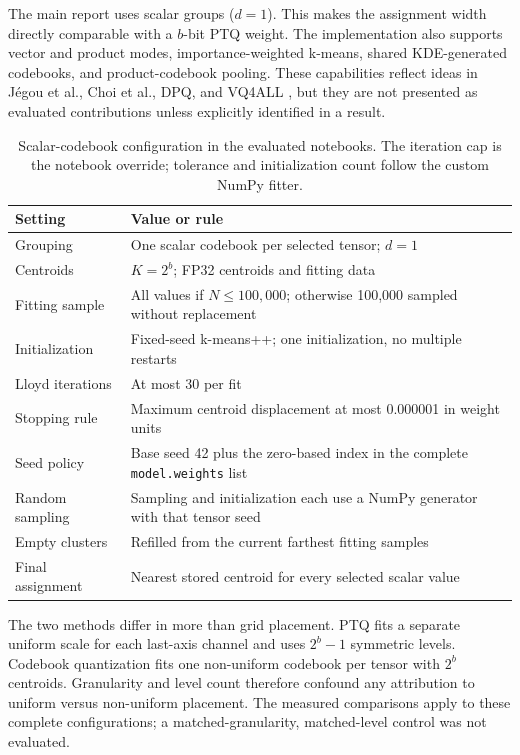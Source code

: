 \documentclass[conference]{IEEEtran}
\begin{document}
The main report uses scalar groups ($d=1$). This makes the assignment width directly comparable with a $b$-bit PTQ weight. The implementation also supports vector and product modes, importance-weighted k-means, shared KDE-generated codebooks, and product-codebook pooling. These capabilities reflect ideas in J\'egou et al., Choi et al., DPQ, and VQ4ALL \cite{jegou2011,choi2017,shao2024,deng2024}, but they are not presented as evaluated contributions unless explicitly identified in a result.

\begin{table}[!t]
\caption{Scalar-codebook configuration in the evaluated notebooks. The iteration cap is the notebook override; tolerance and initialization count follow the custom NumPy fitter.}
\label{tab:codebook-config}
\centering
\scriptsize
\begin{tabular}{@{}p{}p{}@{}}
\toprule
Setting & Value or rule \\
\midrule
Grouping & One scalar codebook per selected tensor; $d=1$ \\
Centroids & $K=2^b$; FP32 centroids and fitting data \\
Fitting sample & All values if $N\leq100{,}000$; otherwise 100,000 sampled without replacement \\
Initialization & Fixed-seed k-means++; one initialization, no multiple restarts \\
Lloyd iterations & At most 30 per fit \\
Stopping rule & Maximum centroid displacement at most 0.000001 in weight units \\
Seed policy & Base seed 42 plus the zero-based index in the complete \texttt{model.weights} list \\
Random sampling & Sampling and initialization each use a NumPy generator with that tensor seed \\
Empty clusters & Refilled from the current farthest fitting samples \\
Final assignment & Nearest stored centroid for every selected scalar value \\
\bottomrule
\end{tabular}
\end{table}

The two methods differ in more than grid placement. PTQ fits a separate uniform scale for each last-axis channel and uses $2^b-1$ symmetric levels. Codebook quantization fits one non-uniform codebook per tensor with $2^b$ centroids. Granularity and level count therefore confound any attribution to uniform versus non-uniform placement. The measured comparisons apply to these complete configurations; a matched-granularity, matched-level control was not evaluated.
\end{document}
